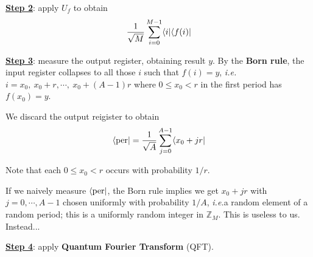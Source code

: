 \documentclass[]{article}
\DeclarePairedDelimiter\bra{\langle}{\rvert}
\theoremstyle{custhm}
\theoremstyle{cusdef}
\theoremstyle{custhm}
\theoremstyle{remark}
\newcommand{\Z}{\mathbb{Z}}
\newcommand{\ie}{\textit{i.e.}}
\begin{document}
\underline{\textbf{Step 2}}: apply $U_f$ to obtain \[\frac{1}{\sqrt{M}}\sum_{i=0}^{M-1}\bra{i}\bra{f(i)}\]

\underline{\textbf{Step 3}}: measure the output register, obtaining result $y$. By the \textbf{Born rule}, the input register collapses to all those $i$ such that $f(i) = y$, \ie $i = x_0,\ x_0+r,\cdots,\ x_0+(A-1)r$ where $0\le x_0 < r$ in the first period has $f(x_0) = y$.

We discard the output reigister to obtain \[\bra{\textrm{per}} = \frac{1}{\sqrt{A}}\sum_{j=0}^{A-1}\bra{x_0+jr}\]

Note that each $0\le x_0 < r$ occurs with probability $1/r$.

If we naively measure $\bra{\textrm{per}}$, the Born rule implies we get $x_0 + jr$ with $j = 0,\cdots,A-1$ chosen uniformly with probability $1/A$, \ie a random element of a random period; this is a uniformly random integer in $\Z_M$. This is useless to us. Instead...

\underline{\textbf{Step 4}}: apply \textbf{Quantum Fourier Transform} (QFT).
\end{document}
